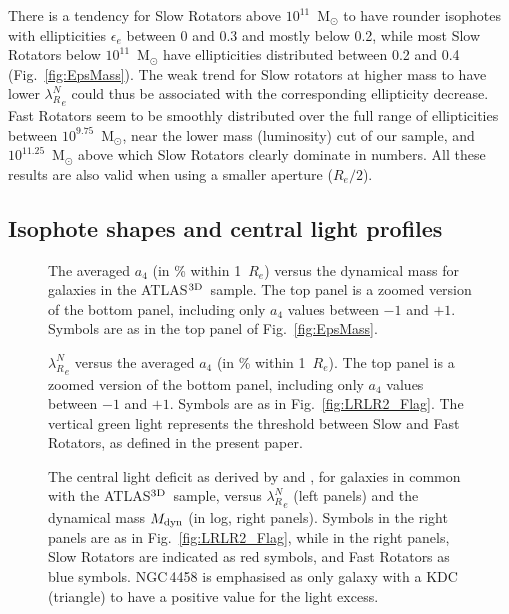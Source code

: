 \documentclass[useAMS,usenatbib,usegraphicx]{mn2e}
\newcommand{\atlas}{{ATLAS$^{\rm 3D}$}}
\begin{document}
There is a tendency for Slow Rotators above $10^{11}$~M$_{\odot}$ to
have rounder isophotes with ellipticities $\epsilon_{e}$ between 0 and 0.3 and
mostly below 0.2, while most Slow Rotators below $10^{11}$~M$_{\odot}$ have
ellipticities distributed between 0.2 and 0.4 (Fig.~\ref{fig:EpsMass}).
The weak trend for Slow rotators at higher mass to have lower ${\lambda_R^N}_{e}$
could thus be associated with the corresponding ellipticity decrease.
Fast Rotators seem to be smoothly distributed over the full range of
ellipticities between $10^{9.75}$~M$_{\odot}$, near the lower mass (luminosity) cut 
of our sample, and $10^{11.25}$~M$_{\odot}$ above which Slow Rotators clearly dominate in numbers.
All these results are also valid when using a smaller aperture ($R_e/2$).

\subsection{Isophote shapes and central light profiles}
\begin{figure}
\centering
{}
\caption{The averaged $a_4$ (in \% within 1~$R_e$) versus the dynamical mass for
galaxies in the \atlas\ sample. 
The top panel is a zoomed version of the bottom panel, including only $a_4$
values between $-1$ and $+1$. Symbols are as in the top panel of Fig.~\ref{fig:EpsMass}. }
\label{fig:Massa4}
\end{figure}
\begin{figure}
\centering
{}
\caption{${\lambda_R^N}_{e}$ versus the averaged $a_4$ (in \% within 1~$R_e$). 
The top panel is a zoomed version of the bottom panel, including only $a_4$
values between $-1$ and $+1$. Symbols are as in Fig.~\ref{fig:LRLR2_Flag}. 
The vertical green light represents the threshold between Slow and Fast Rotators, as
defined in the present paper.}
\label{fig:LRa4}
\end{figure}
\begin{figure}
\centering
{}
\caption{The central light deficit as derived by
\citet[][top panel]{Glass+10} and \citet[][bottom panel]{Kormendy+09}, for galaxies in common with
the \atlas\ sample, versus ${\lambda_R^N}_e$ (left panels) and the dynamical mass $M_{\rm dyn}$ (in log, right panels). 
Symbols in the right panels are as in Fig.~\ref{fig:LRLR2_Flag}, while
in the right panels, Slow Rotators are indicated as red symbols, and Fast Rotators as blue symbols. 
NGC\,4458 is emphasised as only galaxy with a KDC (triangle) to have a positive
value for the light excess.}
\label{fig:ExcessMass}
\end{figure}
\end{document}
